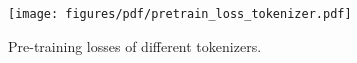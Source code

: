 \begin{figure}[ht]
    \centering
    \texttt{[image: figures/pdf/pretrain\_loss\_tokenizer.pdf]}
    \caption{Pre-training losses of different tokenizers.}
    \label{fig:pretrain_loss_tokenizer}
\end{figure}